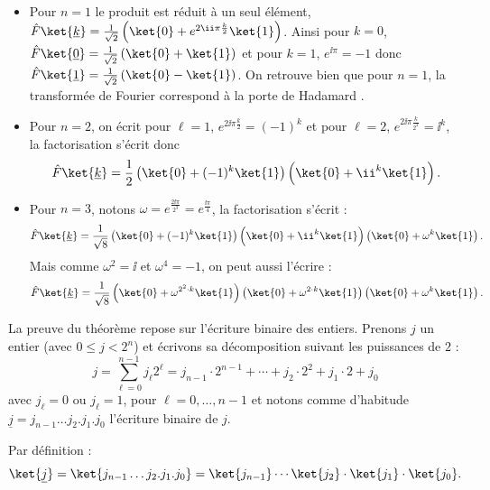 \documentclass[11pt,class=report,crop=false]{standalone}
\begin{document}
\begin{exemple}
\sauteligne
\begin{itemize}
  \item Pour $n=1$ le produit est réduit à un seul élément, $\hat F \ket{\underline k} = \frac{1}{\sqrt{2}}\left( \ket{0} + e^{2\ii \pi \frac{k}{2}} \ket{1} \right)$. Ainsi pour $k=0$, $\hat F \ket{\underline 0} = \frac{1}{\sqrt{2}}\left( \ket{0} +  \ket{1} \right)$ et pour $k=1$, $e^{\ii\pi}=-1$ donc $\hat F \ket{\underline 1} = \frac{1}{\sqrt{2}}\left( \ket{0} -  \ket{1} \right)$. On retrouve bien que pour $n=1$,
  la transformée de Fourier correspond à la porte de Hadamard .

  \item Pour $n=2$, on écrit pour $\ell=1$, $e^{2\ii \pi \frac{k}{2}} = (-1)^k$ et pour 
$\ell=2$, $e^{2\ii \pi \frac{k}{2^2}} = \ii^k$, la factorisation s'écrit donc 
$$\hat F \ket{\underline k} 
= \frac{1}{2} \left( \ket{0} + (-1)^k \ket{1} \right)
\left( \ket{0} + \ii^k \ket{1} \right).$$

  \item Pour $n=3$, notons $\omega=e^{\frac{2\ii\pi}{2^3}}=e^{\frac{\ii\pi}{4}}$,
la factorisation s'écrit :
$$\hat F \ket{\underline k} 
= \frac{1}{\sqrt8} 
\left( \ket{0} + (-1)^k \ket{1} \right)
\left( \ket{0} + \ii^k \ket{1} \right)
\left( \ket{0} + \omega^k \ket{1} \right)
.$$
Mais comme $\omega^2 = \ii$ et $\omega^4 = -1$, on peut aussi l'écrire :
$$\hat F \ket{\underline k} 
= \frac{1}{\sqrt8} 
\left( \ket{0} + \omega^{2^2 \cdot k} \ket{1} \right)
\left( \ket{0} + \omega^{2 \cdot k} \ket{1} \right)
\left( \ket{0} + \omega^k \ket{1} \right)
.$$
\end{itemize}
\end{exemple}



La preuve du théorème repose sur l'écriture binaire des entiers.
Prenons $j$ un entier (avec $0 \le j < 2^n$) et écrivons sa décomposition suivant les puissances de $2$ :
$$j = \sum_{\ell=0}^{n-1} j_\ell 2^\ell = j_{n-1} \cdot 2^{n-1} + \cdots + j_2 \cdot 2^2 + j_1 \cdot 2 + j_0$$
avec $j_\ell = 0$ ou $j_\ell=1$, pour $\ell=0,\ldots,n-1$ et notons comme d'habitude $\underline j = j_{n-1} \ldots j_2 .j_1.j_0$ l'écriture binaire de $j$.

Par définition :
$$\ket{\underline j} 
= \ket{j_{n-1} \ldots j_2 .j_1.j_0}
= \ket{j_{n-1}} \cdots \ket{j_{2}}\cdot \ket{j_{1}}\cdot \ket{j_{0}}.$$
\end{document}
